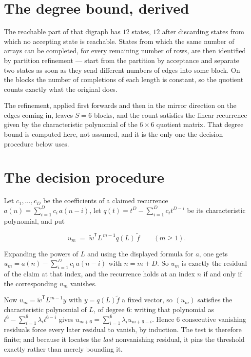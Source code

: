 \documentclass[11pt]{article}
\theoremstyle{definition}
\begin{document}
\section{The degree bound, derived}

The reachable part of that digraph has $12$ states, $12$ after discarding states from which no accepting state is reachable. States from which the same number of arrays can be completed, for every remaining number of rows, are then identified by partition refinement --- start from the partition by acceptance and separate two states as soon as they send different numbers of edges into some block. On the blocks the number of completions of each length is constant, so the quotient counts exactly what the original does.

The refinement, applied first forwards and then in the mirror direction on the edges coming in, leaves $S = 6$ blocks, and the count satisfies the linear recurrence given by the characteristic polynomial of the $6 \times 6$ quotient matrix. That degree bound is computed here, not assumed, and it is the only one the decision procedure below uses.

\section{The decision procedure}

Let $c_1,\dots,c_D$ be the coefficients of a claimed recurrence $a(n) = \sum_{i=1}^{D} c_i\,a(n-i)$, let $q(t) = t^{D} - \sum_{i=1}^{D} c_i t^{D-i}$ be its characteristic polynomial, and put

\[u_m \;=\; \tilde w^{\mathsf T} L^{\,m-1} q(L)\,\tilde f \qquad (m \ge 1).\]

Expanding the powers of $L$ and using the displayed formula for $a$, one gets $u_m = a(n) - \sum_{i=1}^{D} c_i\,a(n-i)$ with $n = m + D$. So $u_m$ is exactly the residual of the claim at that index, and the recurrence holds at an index $n$ if and only if the corresponding $u_m$ vanishes.

Now $u_m = \tilde w^{\mathsf T} L^{m-1} y$ with $y = q(L)\tilde f$ a fixed vector, so $(u_m)$ satisfies the characteristic polynomial of $L$, of degree $6$: writing that polynomial as $t^{6} - \sum_{i=1}^{6} \lambda_i t^{6-i}$ gives $u_{m+6} = \sum_{i=1}^{6} \lambda_i u_{m+6-i}$. Hence $6$ consecutive vanishing residuals force every later residual to vanish, by induction. The test is therefore finite; and because it locates the {\itshape last} nonvanishing residual, it pins the threshold exactly rather than merely bounding it.
\end{document}
